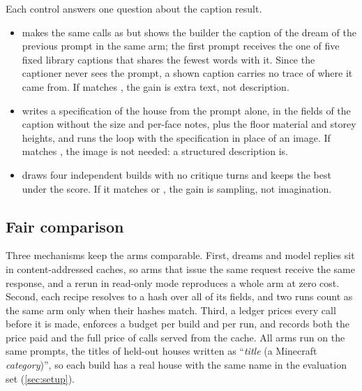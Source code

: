 Each control answers one question about the caption result.
\begin{itemize}[leftmargin=*,itemsep=1pt,topsep=2pt]
  \item \shufcap{} makes the same calls as \dreamcap{} but shows the builder the caption of the
    dream of the previous prompt in the same arm; the first prompt receives the one of five fixed
    library captions that shares the fewest words with it. Since the captioner never sees the
    prompt, a shown caption carries no trace of where it came from. If \shufcap{} matches
    \dreamcap{}, the gain is extra text, not description.
  \item \textspec{} writes a specification of the house from the prompt alone, in the fields
    of the caption without the size and per-face notes, plus the floor material and storey heights, and runs the \classicm{}
    loop with the specification in place of an image. If \textspec{} matches \dreamcap{}, the
    image is not needed: a structured description is. 
  \item \bestoffour{} draws four independent \classicm{} builds with no critique turns and keeps
    the best under the \classicm{} score. If it matches \dream{} or \dreamcap{}, the gain is
    sampling, not imagination.
\end{itemize}

\subsection{Fair comparison}
\label{sec:fair}

Three mechanisms keep the arms comparable. First, dreams and model replies sit in
content-addressed caches, so arms that issue the same request receive the same response, and a
rerun in read-only mode reproduces a whole arm at zero cost. Second, each recipe resolves to a
hash over all of its fields, and two runs count as the same arm only when their hashes match.
Third, a ledger prices every call before it is made, enforces a budget per build and per run, and
records both the price paid and the full price of calls served from the cache.
All arms run on the same prompts, the titles of held-out houses written as
``\textit{title} (a Minecraft \textit{category})'', so each build has a real house with the same
name in the evaluation set (\cref{sec:setup}).
